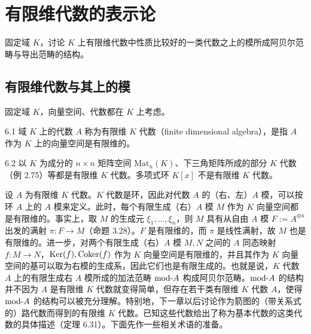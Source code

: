 \chapter{有限维代数的表示论}

固定域 $K$，讨论 $K$ 上有限维代数中性质比较好的一类代数之上的模所成阿贝尔范畴与导出范畴的结构。

\section{有限维代数与其上的模}

固定域 $K$，向量空间、代数都在 $K$ 上考虑。

\begin{definition}{6.1}
域 $K$ 上的代数 $A$ 称为有限维 $K$ 代数（finite dimensional algebra），是指 $A$ 作为 $K$ 上的向量空间是有限维的。
\end{definition}

\begin{example}{6.2}
以 $K$ 为成分的 $n\times n$ 矩阵空间 $\mathrm{Mat}_n(K)$、下三角矩阵所成的部分 $K$ 代数（例 2.75）等都是有限维 $K$ 代数。多项式环 $K[x]$ 不是有限维 $K$ 代数。
\end{example}

设 $A$ 为有限维 $K$ 代数。$K$ 代数是环，因此对代数 $A$ 的（右、左）$A$ 模，可以按环 $A$ 上的 $A$ 模来定义。此时，每个有限生成（右）$A$ 模 $M$ 作为 $K$ 向量空间都是有限维的。事实上，取 $M$ 的生成元 $\xi_1,\dots,\xi_n$，则 $M$ 具有从自由 $A$ 模 $F := A^{\oplus n}$ 出发的满射 $\pi\colon F\to M$（命题 3.28）。$F$ 是有限维的，而 $\pi$ 是线性满射，故 $M$ 也是有限维的。进一步，对两个有限生成（右）$A$ 模 $M,N$ 之间的 $A$ 同态映射 $f\colon M\to N$，$\operatorname{Ker}(f),\operatorname{Coker}(f)$ 作为 $K$ 向量空间是有限维的，并且其作为 $K$ 向量空间的基可以取为右模的生成系，因此它们也是有限生成的。也就是说，$K$ 代数 $A$ 上的有限生成右 $A$ 模所成的加法范畴 $\mathrm{mod}\text{-}A$ 构成阿贝尔范畴。$\mathrm{mod}\text{-}A$ 的结构并不因为 $A$ 是有限维 $K$ 代数就变得简单，但存在若干类有限维 $K$ 代数 $A$，使得 $\mathrm{mod}\text{-}A$ 的结构可以被充分理解。特别地，下一章以后讨论作为箭图的（带关系式的）路代数而得到的有限维 $K$ 代数。已知这些代数给出了称为基本代数的这类代数的具体描述（定理 6.31）。下面先作一些相关术语的准备。


